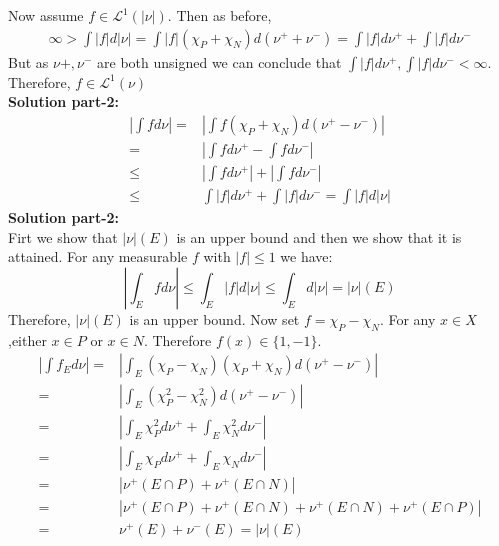 \documentclass[notoc]{tufte-book}
\begin{document}
Now assume $f\in\mathcal L^1(|\nu|)$. Then as before,
\begin{align}
	\infty>\int|f|d|\nu|=\int|f|(\chi_P+\chi_N)d(\nu^++\nu^-)=\int|f|d\nu^++\int|f|d\nu^-
\end{align}
But as $\nu+,\nu^-$ are both unsigned we can conclude that $\int|f|d\nu^+,\int|f|d\nu^-<\infty$. Therefore, $f\in\mathcal L^1(\nu)$\\
\textbf{Solution part-2:}\\
\begin{align*}
	\left|\int fd\nu\right|=&\left|\int f(\chi_P+\chi_N)d(\nu^+-\nu^-)\right|\\
	=&\left|\int f d\nu^+-\int f d\nu^- \right|\\
	\leq&\left|\int f d\nu^+\right|+\left|\int f d\nu^- \right|\\
	\leq&\int |f| d\nu^++\int |f| d\nu^-=\int|f|d|\nu|
\end{align*}
\textbf{Solution part-2:}\\
Firt we show that $|\nu|(E)$ is an upper bound and then we show that it is attained. For any measurable $f$ with $|f|\leq1$ we have:
$$\left|\int_Efd\nu\right|\leq \int_E|f|d|\nu|\leq \int_Ed|\nu|=|\nu|(E)$$
Therefore, $|\nu|(E)$ is an upper bound. Now set $f=\chi_P-\chi_N$. For any $x\in X$,either  $x\in P$ or $x\in N$. Therefore $f(x)\in\{1,-1\}$.  
\begin{align*}
	\left|\int f_Ed\nu\right|=&\left|\int_E (\chi_P-\chi_N)(\chi_P+\chi_N)d(\nu^+-\nu^-)\right|\\
	=&\left|\int_E(\chi_P^2-\chi_N^2)d(\nu^+-\nu^-)\right|\\
	=&\left|\int_E\chi_P^2d\nu^++\int_E\chi_N^2d\nu^-\right|\\
	=&\left|\int_E\chi_Pd\nu^++\int_E\chi_Nd\nu^-\right|\\
	=&|\nu^+(E\cap P)+\nu^+(E\cap N)|\\
	=&|\nu^+(E\cap P)+\nu^+(E\cap N)+\nu^+(E\cap N)+\nu^+(E\cap P)|\\
	=&\nu^+(E)+\nu^-(E)=|\nu|(E)
\end{align*}
\end{document}
